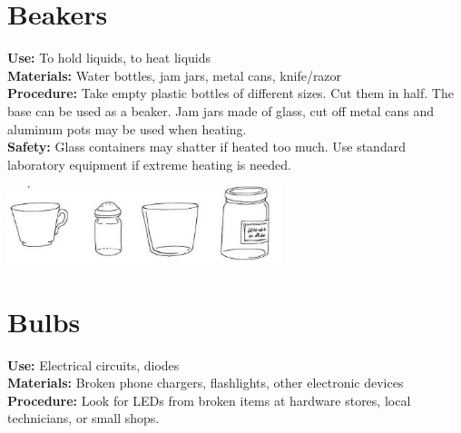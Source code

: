 \begin{multicols}{2}
\section{Beakers}
\label{sec:beakers}
\vspace{-10pt}
\textbf{Use:} To hold liquids, to heat liquids\\
\textbf{Materials:} Water bottles, jam jars, metal cans, knife\slash razor\\
\textbf{Procedure:} Take empty plastic bottles of different sizes. Cut them in half. The base can be used as a beaker. Jam jars made of glass, cut off metal cans and aluminum pots may be used when heating.\\
\textbf{Safety:} Glass containers may shatter if heated too much. Use standard laboratory equipment if extreme heating is needed.
\begin{center}
\includegraphics[width=8cm]{./img/vso/beakers.jpg}
\end{center} 


\section{Bulbs}
\label{sec:lightbulbs}
\vspace{-10pt}
\textbf{Use:} Electrical circuits, diodes\\
\textbf{Materials:} Broken phone chargers, flashlights, other electronic devices\\
\textbf{Procedure:} Look for LEDs from broken items at hardware stores, local technicians, or small shops. 


\end{multicols}
